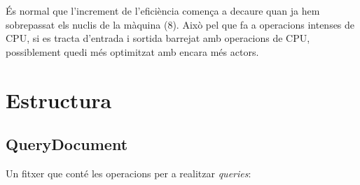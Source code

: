 \documentclass{article}
\begin{document}
És normal que l'increment de l'eficiència comença a decaure quan ja hem
sobrepassat els nuclis de la màquina (8). Això pel que fa a operacions intenses
de CPU, si es tracta d'entrada i sortida barrejat amb operacions de CPU,
possiblement quedi més optimitzat amb encara més actors.

\section{Estructura}

\subsection{QueryDocument}

Un fitxer que conté les operacions per a realitzar \emph{queries}:
\end{document}
